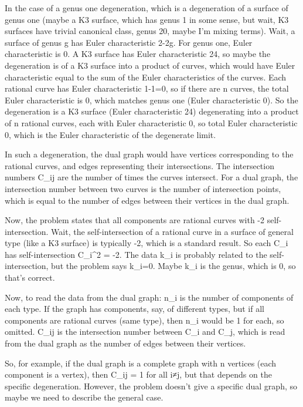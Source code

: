 In the case of a genus one degeneration, which is a degeneration of a surface of genus one (maybe a K3 surface, which has genus 1 in some sense, but wait, K3 surfaces have trivial canonical class, genus 20, maybe I'm mixing terms). Wait, a surface of genus g has Euler characteristic 2-2g. For genus one, Euler characteristic is 0. A K3 surface has Euler characteristic 24, so maybe the degeneration is of a K3 surface into a product of curves, which would have Euler characteristic equal to the sum of the Euler characteristics of the curves. Each rational curve has Euler characteristic 1-1=0, so if there are n curves, the total Euler characteristic is 0, which matches genus one (Euler characteristic 0). So the degeneration is a K3 surface (Euler characteristic 24) degenerating into a product of n rational curves, each with Euler characteristic 0, so total Euler characteristic 0, which is the Euler characteristic of the degenerate limit. 

In such a degeneration, the dual graph would have vertices corresponding to the rational curves, and edges representing their intersections. The intersection numbers C_ij are the number of times the curves intersect. For a dual graph, the intersection number between two curves is the number of intersection points, which is equal to the number of edges between their vertices in the dual graph. 

Now, the problem states that all components are rational curves with -2 self-intersection. Wait, the self-intersection of a rational curve in a surface of general type (like a K3 surface) is typically -2, which is a standard result. So each C_i has self-intersection C_i^2 = -2. The data k_i is probably related to the self-intersection, but the problem says k_i=0. Maybe k_i is the genus, which is 0, so that's correct. 

Now, to read the data from the dual graph: n_i is the number of components of each type. If the graph has components, say, of different types, but if all components are rational curves (same type), then n_i would be 1 for each, so omitted. C_ij is the intersection number between C_i and C_j, which is read from the dual graph as the number of edges between their vertices. 

So, for example, if the dual graph is a complete graph with n vertices (each component is a vertex), then C_ij = 1 for all i≠j, but that depends on the specific degeneration. However, the problem doesn't give a specific dual graph, so maybe we need to describe the general case. 

